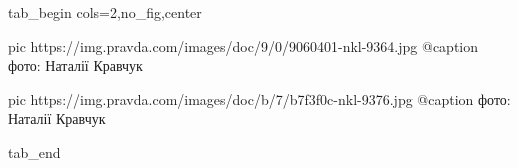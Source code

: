  
 
 
 
 

\ifcmt
  tab_begin cols=2,no_fig,center

     pic https://img.pravda.com/images/doc/9/0/9060401-nkl-9364.jpg
		 @caption фото: Наталії Кравчук

		 pic https://img.pravda.com/images/doc/b/7/b7f3f0c-nkl-9376.jpg
		 @caption фото: Наталії Кравчук

  tab_end
\fi
